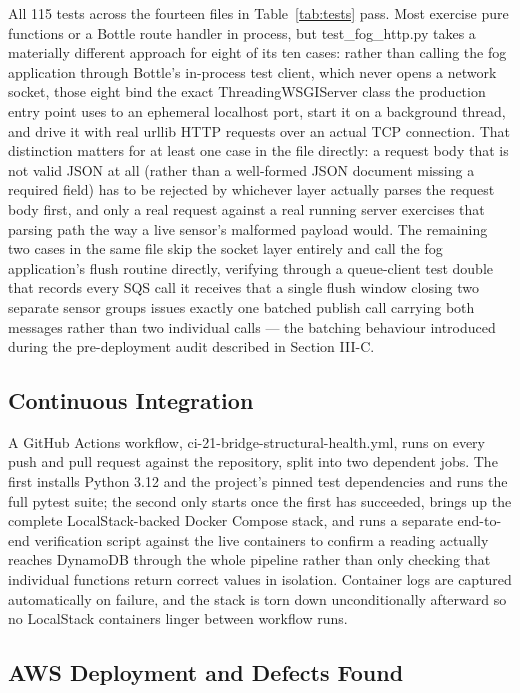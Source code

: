 \documentclass[conference]{IEEEtran}
\begin{document}
All 115 tests across the fourteen files in Table~\ref{tab:tests} pass. Most exercise pure functions or a Bottle route handler in process, but test\_fog\_http.py takes a materially different approach for eight of its ten cases: rather than calling the fog application through Bottle's in-process test client, which never opens a network socket, those eight bind the exact ThreadingWSGIServer class the production entry point uses to an ephemeral localhost port, start it on a background thread, and drive it with real urllib HTTP requests over an actual TCP connection. That distinction matters for at least one case in the file directly: a request body that is not valid JSON at all (rather than a well-formed JSON document missing a required field) has to be rejected by whichever layer actually parses the request body first, and only a real request against a real running server exercises that parsing path the way a live sensor's malformed payload would. The remaining two cases in the same file skip the socket layer entirely and call the fog application's flush routine directly, verifying through a queue-client test double that records every SQS call it receives that a single flush window closing two separate sensor groups issues exactly one batched publish call carrying both messages rather than two individual calls --- the batching behaviour introduced during the pre-deployment audit described in Section III-C.

\subsection{Continuous Integration}

A GitHub Actions workflow, ci-21-bridge-structural-health.yml, runs on every push and pull request against the repository, split into two dependent jobs. The first installs Python 3.12 and the project's pinned test dependencies and runs the full pytest suite; the second only starts once the first has succeeded, brings up the complete LocalStack-backed Docker Compose stack, and runs a separate end-to-end verification script against the live containers to confirm a reading actually reaches DynamoDB through the whole pipeline rather than only checking that individual functions return correct values in isolation. Container logs are captured automatically on failure, and the stack is torn down unconditionally afterward so no LocalStack containers linger between workflow runs.

\subsection{AWS Deployment and Defects Found}
\end{document}
